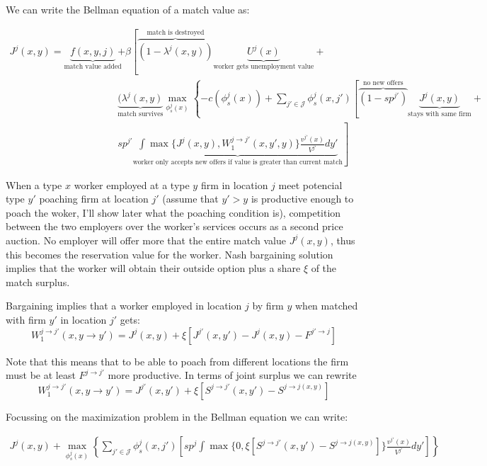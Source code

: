 \documentclass[
  letterpaper,
  DIV=11,
  numbers=noendperiod]{scrreprt}
\begin{document}
We can write the Bellman equation of a match value as:

\begin{align*}
J^j(x,y) = \underbrace{f(x,y,j)}_{\text{match value added}} &+ \beta\left[  \overbrace{ (1-\lambda^j(x,y)) }^{\text{match is destroyed}}\underbrace{U^{j}(x)}_{\text{worker gets unemployment value}} \right. + \\
  & \underbrace{(\lambda^j(x,y)}_{\text{match survives}} \max_{\phi_s^j(x)}\left\{-c(\phi_s^j(x)) +  \sum_{j'\in\mathcal{J}}\phi^j_s(x,j')\left[ \overbrace{(1-sp^{j'})}^{\text{no new offers}} \underbrace{J^j(x,y)}_{\text{stays with same firm}} \right. \right. +\\
& sp^{j'} \left. \underbrace{\int\max\{J^{j}(x,y),W^{j\to j'}_{1}(x,y',y)\}\frac{v^{j'}(x)}{V^{j'}}dy'}_{\text{worker only accepts new offers if value is greater than current match}}  \right]
\end{align*}

When a type \(x\) worker employed at a type \(y\) firm in location \(j\)
meet potencial type \(y'\) poaching firm at location \(j'\) (assume that
\(y'>y\) is productive enough to poach the woker, I'll show later what
the poaching condition is), competition between the two employers over
the worker's services occurs as a second price auction. No employer will
offer more that the entire match value \(J^j(x,y)\), thus this becomes
the reservation value for the worker. Nash bargaining solution implies
that the worker will obtain their outside option plus a share \(\xi\) of
the match surplus.

Bargaining implies that a worker employed in location \(j\) by firm
\(y\) when matched with firm \(y'\) in location \(j'\) gets:
\[W^{j \to j'}_{1}(x,y \to y') = J^{j}(x,y) + \xi [J^{j'}(x,y') - J^{j}(x,y) - F^{j' \to j}]\]

Note that this means that to be able to poach from different locations
the firm must be at least \(F^{j\to j'}\) more productive. In terms of
joint surplus we can rewrite
\[W^{j \to j'}_{1}(x,y \to y') = J^{j'}(x,y') + \xi \left[S^{j\to j'}(x,y') - S^{j \to j(x,y)}\right]\]

Focussing on the maximization problem in the Bellman equation we can
write:

\begin{align*}
J^j(x,y) + \max_{\phi_s^j(x)} \left\{  \sum_{j'\in\mathcal{J}}\phi^j_s(x,j') \left[ sp^j\int\max\{0,  \xi \left[S^{j\to j'}(x,y') - S^{j \to j(x,y)}\right] \}\frac{v^{j'}(x)}{V^{j'}}dy' \right] \right\}
\end{align*}
\end{document}
